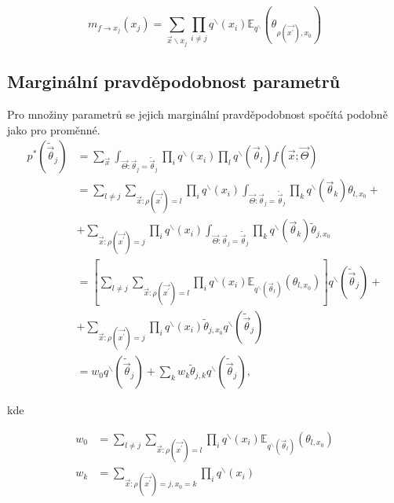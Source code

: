 \begin{equation}
m_{f \rightarrow x_j}(x_j) =
    \sum_{\vec{x} \backslash x_j}
        \prod_{i \ne j}
            q^\backslash(x_i)
            \mathbb{E}_{q^\backslash}
                (\theta_{\rho(\vec{x^\prime}), x_0})
\label{eq:msgfromftox}
\end{equation}

\subsection{Marginální pravděpodobnost parametrů}

Pro množiny parametrů se jejich marginální pravděpodobnost spočítá podobně jako
pro proměnné.
\begin{align}
p^*(\tilde{\vec{\theta}}_j) & = \sum_{\vec{x}} \int_{\vec{\Theta}:
    \vec{\theta}_j = \tilde{\vec{\theta}}_j} \prod_i q^\backslash(x_i) \prod_l
    q^\backslash(\vec{\theta}_l) f(\vec{x}; \vec{\Theta}) \label{eq:ep:theta_1}
\\
& = \sum_{l \ne j} \sum_{\vec{x}: \rho(\vec{x^\prime}) = l} \prod_i
    q^\backslash(x_i) \int_{\vec{\Theta}: \vec{\theta}_j =
    \tilde{\vec{\theta}}_j} \prod_k q^\backslash(\vec{\theta}_k) \theta_{l,
    x_0} + \label{eq:ep:theta_2}
\\
&   + \sum_{\vec{x}: \rho(\vec{x^\prime}) = j} \prod_i q^\backslash(x_i)
    \int_{\vec{\Theta}: \vec{\theta}_j = \tilde{\vec{\theta}}_j} \prod_k
    q^\backslash(\vec{\theta}_k) \tilde{\theta}_{j, x_0}
\nonumber
\\
& = \left[ \sum_{l \ne j} \sum_{\vec{x}: \rho(\vec{x^\prime}) = l} \prod_i
    q^\backslash(x_i) \mathbb{E}_{q^\backslash(\vec{\theta}_l)} (\theta_{l,
    x_0}) \right] q^\backslash(\tilde{\vec{\theta}}_j) + \label{eq:ep:theta_3}
\\
&   + \sum_{\vec{x}: \rho(\vec{x^\prime}) = j} \prod_i q^\backslash(x_i)
    \tilde{\theta}_{j,x_0} q^\backslash(\tilde{\vec{\theta}}_j)
\label{eq:ep:theta_4}
\nonumber
\\
& = w_0 q^\backslash(\tilde{\vec{\theta}}_j) + \sum_k w_k
    \tilde{\theta}_{j,k} q^\backslash(\tilde{\vec{\theta}}_j),
\end{align}

kde

\begin{align}
w_0 &=
	\sum_{l \ne j} 
		\sum_{\vec{x}: \rho(\vec{x^\prime}) = l} 
			\prod_i
 				q^\backslash(x_i)
				\mathbb{E}_{q^\backslash(\vec{\theta}_l)} (
					\theta_{l,
					x_0}) 
\\
w_k &=
	\sum_{\vec{x}: \rho(\vec{x^\prime}) = j, x_0 = k} 
		\prod_i
			q^\backslash(x_i)		
\end{align}

